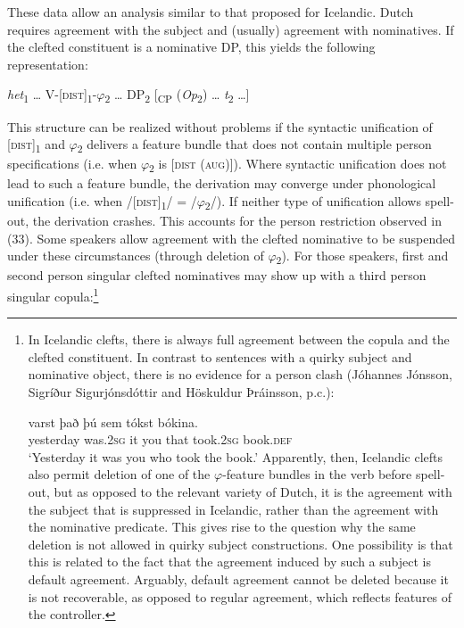 \documentclass[output=paper]{langsci/langscibook}
\begin{document}
These data allow an analysis similar to that proposed for Icelandic. Dutch requires agreement with the subject and (usually) agreement with nominatives. If the clefted constituent is a nominative DP, this yields the following representation: 

\ea 
 \textit{het}\textsubscript{1} … V-[\textsc{dist}]\textsubscript{1}{}-$\varphi $\textsubscript{2} … DP\textsubscript{2} [\textsubscript{CP} (\textit{Op}\textsubscript{2}) … \textit{t}\textsubscript{2} …]
\z

This structure can be realized without problems if the syntactic unification of [\textsc{dist}]\textsubscript{1} and $\varphi $\textsubscript{2} delivers a feature bundle that does not contain multiple person specifications (i.e. when $\varphi $\textsubscript{2} is [\textsc{dist} (\textsc{aug})]). Where syntactic unification does not lead to such a feature bundle, the derivation may converge under phonological unification (i.e. when /[\textsc{dist}]\textsubscript{1}/ = /$\varphi $\textsubscript{2}/). If neither type of unification allows spell-out, the derivation crashes. This accounts for the person restriction observed in (33). Some speakers allow agreement with the clefted nominative to be suspended under these circumstances (through deletion of $\varphi $\textsubscript{2}). For those speakers, first and second person singular clefted nominatives may show up with a third person singular copula:\footnote{In Icelandic clefts, there is always full agreement between the copula and the clefted constituent. In contrast to sentences with a quirky subject and nominative object, there is no evidence for a person clash (Jóhannes Jónsson, Sigríður Sigurjónsdóttir and Höskuldur Þráinsson, p.c.):

\ea {}        varst       það þú   sem tókst       bókina. \\
         yesterday was.\textsc{2sg} it     you that took.\textsc{2sg} book.\textsc{def}\\
    \glt ‘Yesterday it was you who took the book.’
\z Apparently, then, Icelandic clefts also permit deletion of one of the $\varphi $-feature bundles in the verb before spell-out, but as opposed to the relevant variety of Dutch, it is the agreement with the subject that is suppressed in Icelandic, rather than the agreement with the nominative predicate. This gives rise to the question why the same deletion is not allowed in quirky subject constructions. One possibility is that this is related to the fact that the agreement induced by such a subject is default agreement. Arguably, default agreement cannot be deleted because it is not recoverable, as opposed to regular agreement, which reflects features of the controller.}
\end{document}
